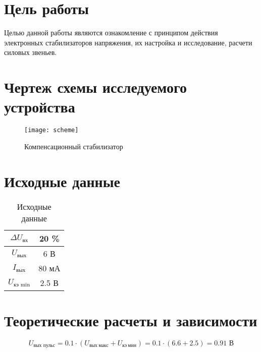 





\section{Цель работы}

Целью данной работы являются ознакомление с принципом действия электронных стабилизаторов напряжения, их настройка и исследование, расчети силовых звеньев.

\section{Чертеж схемы исследуемого устройства}

\begin{figure}[H]
\begin{center}
	\texttt{[image: scheme]}
	\caption{Компенсационный стабилизатор}
\end{center}
\end{figure}

\vspace{-0.5cm}

\section{Исходные данные}

\begin{table}[H]
\begin{center}
	\caption{Исходные данные}
	\def\tabcolsep{36pt}
	\begin{tabular}{|c|c|}
		\hline 
		$\Delta U_\text{вх}$ & 20 \% \\ 
		\hline 
		$U_\text{вых}$ & 6 В \\ 
		\hline 
		$I_\text{вых}$ & 80 мА \\  
		\hline 
		$U_\text{кэ\ min}$ & 2.5 В \\ 
		\hline 
	\end{tabular} 
\end{center}
\end{table}

\newpage

\section{Теоретические расчеты и зависимости}

\begin{displaymath}
	U_\text{вых\ пульс} = 0.1 \cdot ( U_{\text{вых}\ макс} + U_{\text{кэ}\ мин} ) = 0.1 \cdot ( 6.6 + 2.5 ) = 0.91 \text{ В}
\end{displaymath}

